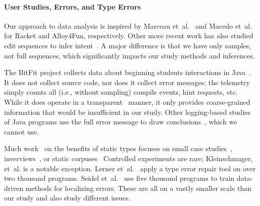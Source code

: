 \documentclass[english,submission,cleveref]{programming}
\begin{document}



\paragraph{User Studies, Errors, and Type Errors}

Our approach to data analysis is inspired by Marceau
et~al.~\cite{mfk-onward-2011,mfk-sigcse-2011} and
Macedo et~al.~\cite{mcpcsprs-abz-2020,mcpcsprs-scp-2021}
for Racket and Alloy4Fun, respectively. Other more recent work has
also studied edit sequences to infer intent~\cite{wk-koli-2020,lgk-pj-2022,rsgl-cpp-2020}.
A major difference is that we have only samples, not full sequences,
which significantly impacts our study methods and inferences.

The BitFit project collects data about beginning students interactions in
Java~\cite{ekc-wccce-2016,anna-russo-kennedy-ms-2006}.
It does not collect source code, nor does it collect error messages;
the telemetry simply counts all (i.e., without sampling) compile events, hint
requests, etc. While it does operate in a
transparent~\cite{transparent-telemetry} manner, it only provides
coarse-grained information that would be insufficient in our study.
Other logging-based studies of Java programs use the full error message to
draw conclusions~\cite{bgimgm-cse-2016,dlc-iticse-2014}, which we
cannot use.

Much work~\cite{empirical-types,heeren-thesis} on the benefits of static types focuses on
small case studies~\cite{w-popl-1986,hw-scp-2004,td-tosem-2001},
inverviews~\cite{cdhhjklwya-hatra-2020,gstf-hatra-2021,cams-oopsla-2020},
or static
corpuses~\cite{rppd-fse-2014,bhmvv-toplas-2019}
Controlled experiments are rare;
Kleinschmager, et~al.\cite{khrts-icpc-2012} is a notable exception.
Lerner et~al.~\cite{lfgc-pldi-2007} apply a type error repair tool on
over two thousand programs.
Seidel et~al.~\cite{sscwj-oopsla-2017,sjw-jfp-2018} use five thousand programs
to train data-driven methods for localizing errors.
These are all on a vastly smaller scale than our study and also study
different issues.

%
%
%
%
%
\end{document}
